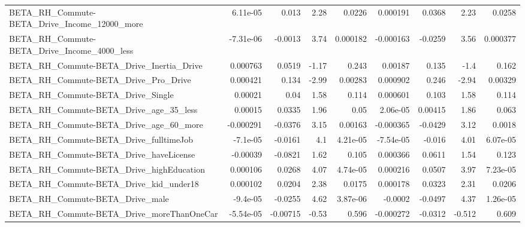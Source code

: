 \begin{tabular}{lrrrrrrrr}
BETA\_RH\_Commute-BETA\_Drive\_Income\_12000\_more       &    6.11e-05 &        0.013 &     2.28 &   0.0226 &   0.000191 &      0.0368 &         2.23 &        0.0258 \\
BETA\_RH\_Commute-BETA\_Drive\_Income\_4000\_less        &   -7.31e-06 &      -0.0013 &     3.74 & 0.000182 &  -0.000163 &     -0.0259 &         3.56 &      0.000377 \\
BETA\_RH\_Commute-BETA\_Drive\_Inertia\_Drive           &    0.000763 &       0.0519 &    -1.17 &    0.243 &    0.00187 &       0.135 &         -1.4 &         0.162 \\
BETA\_RH\_Commute-BETA\_Drive\_Pro\_Drive               &    0.000421 &        0.134 &    -2.99 &  0.00283 &   0.000902 &       0.246 &        -2.94 &       0.00329 \\
BETA\_RH\_Commute-BETA\_Drive\_Single                  &     0.00021 &         0.04 &     1.58 &    0.114 &   0.000601 &       0.103 &         1.58 &         0.114 \\
BETA\_RH\_Commute-BETA\_Drive\_age\_35\_less             &     0.00015 &       0.0335 &     1.96 &     0.05 &   2.06e-05 &     0.00415 &         1.86 &         0.063 \\
BETA\_RH\_Commute-BETA\_Drive\_age\_60\_more             &   -0.000291 &      -0.0376 &     3.15 &  0.00163 &  -0.000365 &     -0.0429 &         3.12 &        0.0018 \\
BETA\_RH\_Commute-BETA\_Drive\_fulltimeJob             &    -7.1e-05 &      -0.0161 &      4.1 & 4.21e-05 &  -7.54e-05 &      -0.016 &         4.01 &      6.07e-05 \\
BETA\_RH\_Commute-BETA\_Drive\_haveLicense             &    -0.00039 &      -0.0821 &     1.62 &    0.105 &   0.000366 &      0.0611 &         1.54 &         0.123 \\
BETA\_RH\_Commute-BETA\_Drive\_highEducation           &    0.000106 &       0.0268 &     4.07 & 4.74e-05 &   0.000216 &      0.0507 &         3.97 &      7.23e-05 \\
BETA\_RH\_Commute-BETA\_Drive\_kid\_under18             &    0.000102 &       0.0204 &     2.38 &   0.0175 &   0.000178 &      0.0323 &         2.31 &        0.0206 \\
BETA\_RH\_Commute-BETA\_Drive\_male                    &    -9.4e-05 &      -0.0255 &     4.62 & 3.87e-06 &    -0.0002 &     -0.0497 &         4.37 &      1.26e-05 \\
BETA\_RH\_Commute-BETA\_Drive\_moreThanOneCar          &   -5.54e-05 &     -0.00715 &    -0.53 &    0.596 &  -0.000272 &     -0.0312 &       -0.512 &         0.609 \\

\end{tabular}
